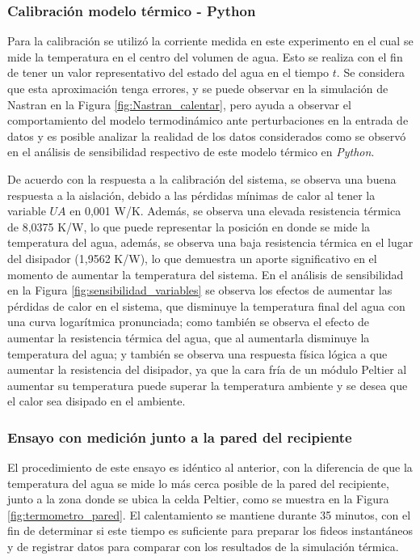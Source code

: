 \documentclass[12pt, a4paper]{article}
\begin{document}
\subsubsection*{Calibración modelo térmico - Python}

Para la calibración se utilizó la corriente medida en este experimento en el cual se mide la temperatura en el centro del volumen de agua. Esto se realiza con el fin de tener un valor representativo del estado del agua en el tiempo $t$. Se considera que esta aproximación tenga errores, y se puede observar en la simulación de Nastran en la Figura \ref{fig:Nastran_calentar}, pero ayuda a observar el comportamiento del modelo termodinámico ante perturbaciones en la entrada de datos y es posible analizar la realidad de los datos considerados como se observó en el análisis de sensibilidad respectivo de este modelo térmico en \textit{Python}.

De acuerdo con la respuesta a la calibración del sistema, se observa una buena respuesta a la aislación, debido a las pérdidas mínimas de calor al tener la variable $UA$ en 0,001 W/K. Además, se observa una elevada resistencia térmica de 8,0375 K/W, lo que puede representar la posición en donde se mide la temperatura del agua, además, se observa una baja resistencia térmica en el lugar del disipador (1,9562 K/W), lo que demuestra un aporte significativo en el momento de aumentar la temperatura del sistema. En el análisis de sensibilidad en la Figura \ref{fig:sensibilidad_variables} se observa los efectos de aumentar las pérdidas de calor en el sistema, que disminuye la temperatura final del agua con una curva logarítmica pronunciada; como también se observa el efecto de aumentar la resistencia térmica del agua, que al aumentarla disminuye la temperatura del agua; y también se observa una respuesta física lógica a que aumentar la resistencia del disipador, ya que la cara fría de un módulo Peltier al aumentar su temperatura puede superar la temperatura ambiente y se desea que el calor sea disipado en el ambiente.


\subsubsection{Ensayo con medición junto a la pared del recipiente}

El procedimiento de este ensayo es idéntico al anterior, con la diferencia de que la temperatura del agua se mide lo más cerca posible de la pared del recipiente, junto a la zona donde se ubica la celda Peltier, como se muestra en la Figura \ref{fig:termometro_pared}. El calentamiento se mantiene durante 35 minutos, con el fin de determinar si este tiempo es suficiente para preparar los fideos instantáneos y de registrar datos para comparar con los resultados de la simulación térmica.
\end{document}
